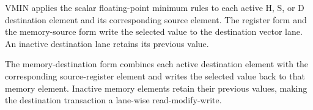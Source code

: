 VMIN applies the scalar floating-point minimum rules to each active H, S, or
D destination element and its corresponding source element. The register form
and the memory-source form write the selected value to the destination vector
lane. An inactive destination lane retains its previous value.

The memory-destination form combines each active destination element with the
corresponding source-register element and writes the selected value back to
that memory element. Inactive memory elements retain their previous values,
making the destination transaction a lane-wise read-modify-write.
